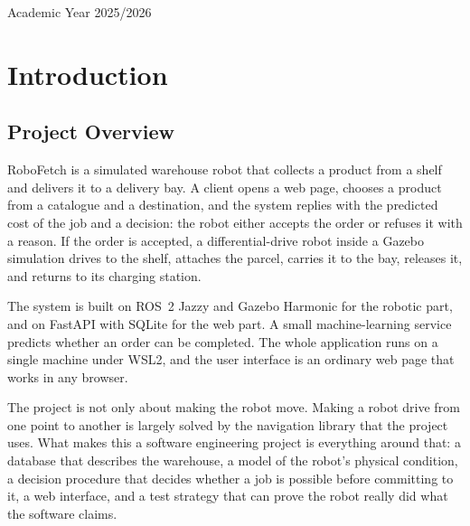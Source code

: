 \documentclass[12pt,a4paper]{report}
\begin{document}
\begin{titlepage}
\vfill

{\large Academic Year 2025/2026 \par}   %

\end{titlepage}

\tableofcontents
\clearpage
{}


\chapter{Introduction}

\section{Project Overview}
RoboFetch is a simulated warehouse robot that collects a product from a shelf and delivers it to
a delivery bay. A client opens a web page, chooses a product from a catalogue and a destination,
and the system replies with the predicted cost of the job and a decision: the robot either accepts
the order or refuses it with a reason. If the order is accepted, a differential-drive robot inside
a Gazebo simulation drives to the shelf, attaches the parcel, carries it to the bay, releases it,
and returns to its charging station.

The system is built on ROS~2 Jazzy and Gazebo Harmonic for the robotic part, and on FastAPI with
SQLite for the web part. A small machine-learning service predicts whether an order can be
completed. The whole application runs on a single machine under WSL2, and the user interface is an
ordinary web page that works in any browser.

The project is not only about making the robot move. Making a robot drive from one point to
another is largely solved by the navigation library that the project uses. What makes this a
software engineering project is everything around that: a database that describes the warehouse,
a model of the robot's physical condition, a decision procedure that decides whether a job is
possible before committing to it, a web interface, and a test strategy that can prove the robot
really did what the software claims.
\end{document}
